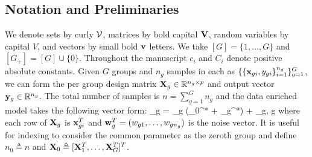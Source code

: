 \subsection{Notation and Preliminaries}
We denote sets by curly $\cV$, matrices by bold capital $\mathbf{V}$, random variables by capital $V$, and vectors by small bold $\mathbf{v}$ letters.
We take $[G] = \{1, \dots, G\}$ and $[G_+] = [G] \cup \{0\}$. Throughout the manuscript $c_i$ and $C_i$ denote positive absolute constants.
Given $G$ groups and $n_g$ samples in each as $\{ \{\mathbf{x}_{gi}, y_{gi} \}_{i=1}^{n_g} \}_{g = 1}^G$, we can form the per group design matrix $\mathbf{X}_g \in \mathbb R^{n_g \times p}$ and output vector $\mathbf{y}_g \in \mathbb R ^{n_g}$.
The total number of samples is  $n = \sum_{g = 1}^{G} n_g$ and the data enriched model takes the following vector form:
\be
\label{eq:dirtymodel}
\y_g = \X_g (\bbeta _0^* + \bbeta _g^*) + \w_g,  \quad \forall g \in [G]
\ee
where each row of $\mathbf{X}_g$ is $\mathbf{x}_{gi}^T$ and $\mathbf{w}_g^T = (w_{g1}, \dots, w_{gn_g})$ is the noise vector. It is useful for indexing to consider the common parameter as the zeroth group and define $n_0 \triangleq n$ and $\mathbf{X}_0 \triangleq [\mathbf{X}_1^T, \dots, \mathbf{X}_G^T]^T$.

